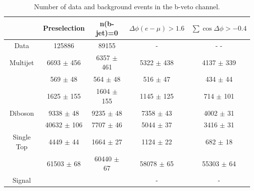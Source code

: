
\begin{table}
  \centering
   \begin{footnotesize}	
  \begin{tabular}{ccccc}
    \hline\hline
	&	Preselection			&	n(b-jet)=0			&	$\Delta\phi(e-\mu)>1.6$			&	$\sum\cos\Delta\phi > -0.4$ 		\\	
    \hline
   \hline
Data	&	125886			&	89155			&	-			&	-				-			\\
Multijet	&	6693	$\pm$	456	&	6357	$\pm$	461	&	5322	$\pm$	438	&	4137	$\pm$	339	\\
\Zll 	&	569	$\pm$	48	&	564	$\pm$	48	&	516	$\pm$	47	&	434	$\pm$	44		\\
\Wlnu	&	1625	$\pm$	155	&	1604	$\pm$	155	&	1145	$\pm$	125	&	714	$\pm$	101		\\
Diboson	&	9338	$\pm$	48	&	9235	$\pm$	48	&	7358	$\pm$	43	&	4002	$\pm$	31		\\
\ttbar	&	40632	$\pm$	106	&	7707	$\pm$	46	&	5044	$\pm$	37	&	3416	$\pm$	31		\\
Single Top	&	4449	$\pm$	44	&	1664	$\pm$	27	&	1124	$\pm$	22	&	682	$\pm$	18	\\
\Ztautau	&	61503	$\pm$	68	&	60440	$\pm$	67	&	58078	$\pm$	65	&	55303	$\pm$	64	\\
Signal	&				&				&	-			&	-						\\
    \hline
  \end{tabular}
  \caption{Number of data and background events in the b-veto channel.}
  \label{tab:eventsel:bveto}
   \end{footnotesize}	
\end{table}

